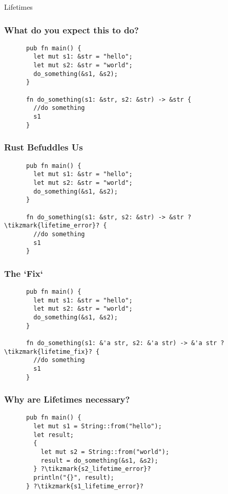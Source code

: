 \begin{section}{Lifetimes}
  \begin{frame}[fragile]
    \frametitle{What do you expect this to do?}
    \begin{verbatim}
      pub fn main() {
        let mut s1: &str = "hello";
        let mut s2: &str = "world";
        do_something(&s1, &s2);
      }

      fn do_something(s1: &str, s2: &str) -> &str {
        //do something
        s1
      }
    \end{verbatim}
  \end{frame}


  \begin{frame}[fragile]
    \frametitle{Rust Befuddles Us}
    \begin{verbatim}
      pub fn main() {
        let mut s1: &str = "hello";
        let mut s2: &str = "world";
        do_something(&s1, &s2);
      }

      fn do_something(s1: &str, s2: &str) -> &str ?\tikzmark{lifetime_error}? {
        //do something
        s1
      }
    \end{verbatim}
  \end{frame}

  \begin{frame}[fragile]
    \frametitle{The `Fix`}
    \begin{verbatim}
      pub fn main() {
        let mut s1: &str = "hello";
        let mut s2: &str = "world";
        do_something(&s1, &s2);
      }

      fn do_something(s1: &'a str, s2: &'a str) -> &'a str ?\tikzmark{lifetime_fix}? {
        //do something
        s1
      }
    \end{verbatim}
  \end{frame}

  \begin{frame}[fragile]
    \frametitle{Why are Lifetimes necessary?}
    \begin{verbatim}
      pub fn main() {
        let mut s1 = String::from("hello");
        let result;
        {
          let mut s2 = String::from("world");
          result = do_something(&s1, &s2);
        } ?\tikzmark{s2_lifetime_error}?
        println("{}", result);
      } ?\tikzmark{s1_lifetime_error}?


\end{verbatim}
\end{frame}
\end{section}
